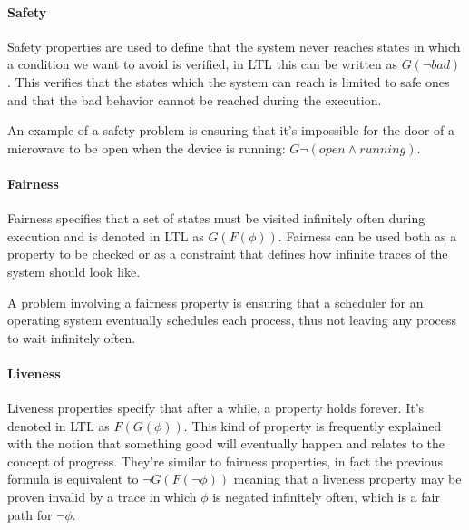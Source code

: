 \paragraph*{Safety} Safety properties are used to define that the system never reaches states in which a condition we want to avoid is verified, in LTL this can be written as \begin{math}G (\lnot bad)\end{math}.
This verifies that the states which the system can reach is limited to safe ones and that the bad behavior cannot be reached during the execution.

An example of a safety problem is ensuring that it's impossible for the door of a microwave to be open when the device is running:
\begin{math}
    G \lnot (open \land running)
\end{math}.

\paragraph*{Fairness} Fairness specifies that a set of states must be visited infinitely often during execution and is denoted in LTL as \begin{math} G(F(\phi))\end{math}.
Fairness can be used both as a property to be checked or as a constraint that defines how infinite traces of the system should look like.

A problem involving a fairness property is ensuring that a scheduler for an operating system eventually schedules each process, thus not leaving any process to wait infinitely often.

\paragraph*{Liveness} Liveness properties specify that after a while, a property holds forever. It's denoted in LTL as \begin{math} F(G(\phi)) \end{math}.
This kind of property is frequently explained with the notion that something good will eventually happen and relates to the concept of progress.
They're similar to fairness properties, in fact the previous formula is equivalent to \begin{math} \lnot G(F(\lnot \phi))\end{math} meaning that a liveness property may be proven invalid by a trace in which \begin{math} \phi \end{math} is negated infinitely often, which is a fair path for \begin{math}\lnot \phi\end{math}.

